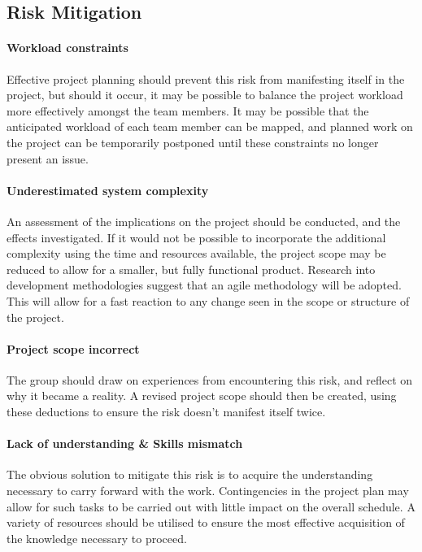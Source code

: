 \subsection{Risk Mitigation}

\paragraph{Workload constraints}
Effective project planning should prevent this risk from manifesting itself in
the project, but should it occur, it may be possible to balance the project
workload more effectively amongst the team members. It may be possible that the
anticipated workload of each team member can be mapped, and planned work on the
project can be temporarily postponed until these constraints no longer present
an issue.

\paragraph{Underestimated system complexity}
An assessment of the implications on the project should be conducted, and the
effects investigated. If it would not be possible to incorporate the additional
complexity using the time and resources available, the project scope may be
reduced to allow for a smaller, but fully functional product. Research into
development methodologies suggest that an agile methodology will be adopted.
This will allow for a fast reaction to any change seen in the scope or structure
of the project.

\paragraph{Project scope incorrect}
The group should draw on experiences from encountering this risk, and reflect on
why it became a reality. A revised project scope should then be created, using
these deductions to ensure the risk doesn't manifest itself twice.

\paragraph{Lack of understanding \& Skills mismatch}
The obvious solution to mitigate this risk is to acquire the understanding
necessary to carry forward with the work. Contingencies in the project plan may
allow for such tasks to be carried out with little impact on the overall
schedule. A variety of resources should be utilised to ensure the most effective
acquisition of the knowledge necessary to proceed.

